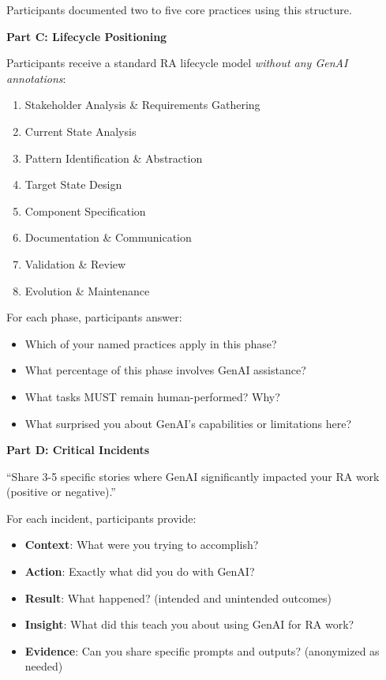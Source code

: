 Participants documented two to five core practices using this structure.

\textbf{Part C: Lifecycle Positioning}

Participants receive a standard RA lifecycle model \textit{without any GenAI
    annotations}:
\begin{enumerate}
    \item Stakeholder Analysis \& Requirements Gathering
    \item Current State Analysis
    \item Pattern Identification \& Abstraction
    \item Target State Design
    \item Component Specification
    \item Documentation \& Communication
    \item Validation \& Review
    \item Evolution \& Maintenance
\end{enumerate}

For each phase, participants answer:
\begin{itemize}
    \item Which of your named practices apply in this phase?
    \item What percentage of this phase involves GenAI assistance?
    \item What tasks MUST remain human-performed? Why?
    \item What surprised you about GenAI's capabilities or limitations here?
\end{itemize}

\textbf{Part D: Critical Incidents}

``Share 3-5 specific stories where GenAI significantly impacted your RA work (positive or negative).''

For each incident, participants provide:
\begin{itemize}
    \item \textbf{Context}: What were you trying to accomplish?
    \item \textbf{Action}: Exactly what did you do with GenAI?
    \item \textbf{Result}: What happened? (intended and unintended outcomes)
    \item \textbf{Insight}: What did this teach you about using GenAI for RA work?
    \item \textbf{Evidence}: Can you share specific prompts and outputs? (anonymized as needed)
\end{itemize}

